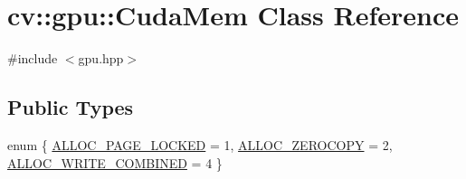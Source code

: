 \hypertarget{classcv_1_1gpu_1_1CudaMem}{\section{cv\-:\-:gpu\-:\-:Cuda\-Mem Class Reference}
\label{classcv_1_1gpu_1_1CudaMem}
}


{\ttfamily \#include $<$gpu.\-hpp$>$}

\subsection*{Public Types}
\begin{DoxyCompactItemize}
\item 
enum \{ \hyperlink{classcv_1_1gpu_1_1CudaMem_a1bb680556fac1e3a41bd00e1c8cf6818a766dff008ee80639564c9ceaa7b2936b}{A\-L\-L\-O\-C\-\_\-\-P\-A\-G\-E\-\_\-\-L\-O\-C\-K\-E\-D} = 1, 
\hyperlink{classcv_1_1gpu_1_1CudaMem_a1bb680556fac1e3a41bd00e1c8cf6818ad0e759094c5bec9f8e2712a77c04316c}{A\-L\-L\-O\-C\-\_\-\-Z\-E\-R\-O\-C\-O\-P\-Y} = 2, 
\hyperlink{classcv_1_1gpu_1_1CudaMem_a1bb680556fac1e3a41bd00e1c8cf6818a4234a593504d7fc26e7cfe4c28d0172d}{A\-L\-L\-O\-C\-\_\-\-W\-R\-I\-T\-E\-\_\-\-C\-O\-M\-B\-I\-N\-E\-D} = 4
 \}
\end{DoxyCompactItemize}
